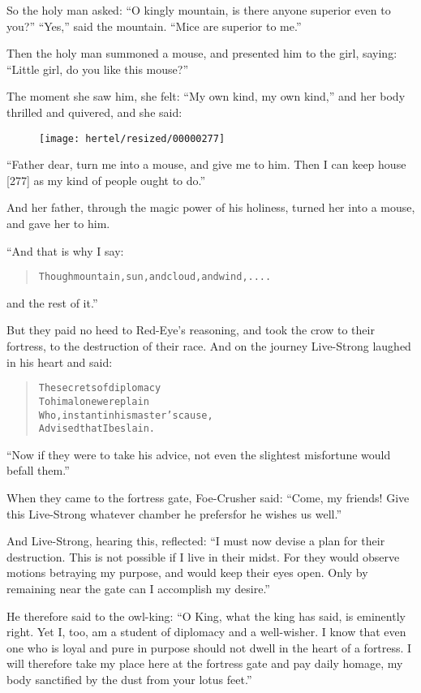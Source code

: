 \documentclass[article, twoside, 10pt]{memoir}
\renewenvironment{verbatim}{%
\begin{quote}%
\vskip -10pt%
\begin{alltt}\normalfont\small}{\end{alltt}%
\end{quote}%
\vskip -10pt
} %
\begin{document}
So the holy man asked:
``O kingly mountain, is there anyone superior even to you?''
``Yes,'' said the mountain. ``Mice are superior to me.''

Then the holy man summoned a mouse, and presented him to the girl,
saying: ``Little girl, do you like this mouse?''

The moment she saw him, she felt: ``My own kind, my own kind,'' and
her body thrilled and quivered, and she said:
\begin{figure}[p]\texttt{[image: hertel/resized/00000277]}\end{figure}``Father dear, turn me into a mouse, and give me to him. Then I can keep house [277] as my kind of people ought to do.''

And her father, through the magic power of his holiness, turned her
into a mouse, and gave her to him.

“And that is why I say:

\begin{verbatim}
Though mountain, sun, and cloud, and wind, ....
\end{verbatim}
and the rest of it.”

But they paid no heed to Red-Eye's reasoning, and took the crow to
their fortress, to the destruction of their race. And on the
journey Live-Strong laughed in his heart and said:

\begin{verbatim}
The secrets of diplomacy
    To him alone were plain
Who, instant in his master's cause,
    Advised that I be slain.
\end{verbatim}
``Now if they were to take his advice, not even the slightest misfortune would befall them.''

When they came to the fortress gate, Foe-Crusher said:
``Come, my friends! Give this Live-Strong whatever chamber he prefers{\textemdash}for he wishes us well.''

And Live-Strong, hearing this, reflected:
``I must now devise a plan for their destruction. This is not possible if I live in their midst. For they would observe motions betraying my purpose, and would keep their eyes open. Only by remaining near the gate can I accomplish my desire.''

He therefore said to the owl-king:
``O King, what the king has said, is eminently right. Yet I, too, am a student of diplomacy and a well-wisher. I know that even one who is loyal and pure in purpose should not dwell in the heart of a fortress. I will therefore take my place here at the fortress gate and pay daily homage, my body sanctified by the dust from your lotus feet.''
\end{document}
